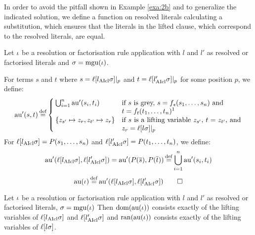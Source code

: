 \documentclass[,%
	draft=false,%
	numbers=noendperiod
	11pt,
	a4paper,
	oneside,%
	openany,
]{memoir}
\begin{document}
In order to avoid the pitfall shown in Example \ref{exa:2b} and to generalize the indicated solution,
we define a function on resolved literals calculating a substitution, which ensures that the literals in the lifted clause, which correspond to the resolved literals, are equal.

\begin{defi}[$\aiu$]
	Let $\iota$ be a resolution or factorisation rule application with $l$ and $l'$ as resolved or factorised literals and $\sigma = \operatorname{mgu}(\iota)$.

	\newcommand{\aiuP}{\aiu'}

	For terms $s$ and $t$ where
	$s = \ell[l_{\operatorname{AIcl}}\sigma]|_{p}$
	and
	$t = \ell[l'_{\operatorname{AIcl}}\sigma]|_{p}$
	for some position $p$, we define:
	\[
		\aiuP (s, t) \defeq
		\begin{cases}
			\bigcup_{i=1}^n \aiuP(s_i, t_i) &
			\parbox[t]{.50\textwidth}{
			if $s$ is grey, $s=f_s(s_1, \dots, s_n)$ and\newline$t = f_{t}(t_1,\dots, t_n)$\footnotemark} \\
			\{z_{s'} \mapsto z_r, z_{t'} \mapsto z_r\} &
			\parbox[t]{.50\textwidth}{
				if $s$ is a lifting variable $z_{s'}$, $t = z_{t'}$,
				and $z_r = \lifboth{l\sigma}\at{p}$
			}
		\end{cases}
	\]
	For $\ell[l_{\operatorname{AIcl}}\sigma] = P(s_1, \dots, s_n)$ and $\ell[l'_{\operatorname{AIcl}}\sigma] = P(t_1, \dots, t_n)$, we define:
	\[
		\aiuP(\lifboth{l\cl\sigma}, \lifboth{l'\cl\sigma}) =
		\aiuP(P(\overline s), P(\overline t)) \defeq \bigcup_{i=1}^n \aiuP(s_i, t_i)
	\]
	\[
		\aiu(\inference) \defeq \aiuP(\lifboth{l\cl\sigma}, \lifboth{l'\cl\sigma}) \qedhere
	\]
\end{defi}

\begin{prop}
	\label{prop:tau_dom_ran}
	Let $\iota$ be a resolution or factorisation rule application with $l$ and $l'$ as resolved or factorised literals, $\sigma = \operatorname{mgu}(\iota)$
	Then $\operatorname{dom}(\operatorname{au}(\iota))$ consists exactly of the lifting variables of $\ell[l_{\operatorname{AIcl}}\sigma]$ and $\ell[l'_{\operatorname{AIcl}}\sigma]$ and $\operatorname{ran}(\operatorname{au}(\iota))$ consists exactly of the lifting variables of $\ell[l\sigma]$.
\end{prop}
\end{document}
